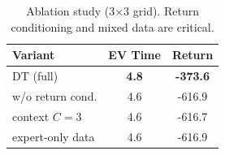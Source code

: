 \begin{table}[t]
  \caption{Ablation study (3$\times$3 grid). Return conditioning and mixed data are critical.}
  \label{tab:ablation}
  \centering
  \begin{tabular}{lcc}
    \toprule
    \textbf{Variant} & \textbf{EV Time} & \textbf{Return} \\
    \midrule
    DT (full)                      & \textbf{4.8} & \textbf{-373.6} \\
    \quad w/o return cond.         & 4.6 & -616.9 \\
    \quad context $C{=}3$          & 4.6 & -616.7 \\
    \quad expert-only data         & 4.6 & -616.9 \\
    \bottomrule
  \end{tabular}
\end{table}